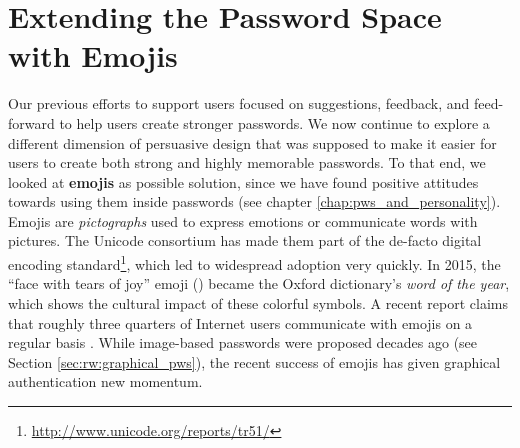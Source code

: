\chapter[Extending the Password Space with Emojis]{Extending the Password Space with Emojis}\label{chap:emojipasswords}

Our previous efforts to support users focused on suggestions, feedback, and feed-forward to help users create stronger passwords. We now continue to explore a different dimension of persuasive design that was supposed to make it easier for users to create both strong and highly memorable passwords. To that end, we looked at \textbf{emojis} as possible solution, since we have found positive attitudes towards using them inside passwords (see chapter \ref{chap:pws_and_personality}). Emojis are \textit{pictographs} used to express emotions or communicate words with pictures. The Unicode consortium has made them part of the de-facto digital encoding standard\footnote{\label{foot:emoji-standard}\url{http://www.unicode.org/reports/tr51/}}, which led to widespread adoption very quickly. In 2015, the ``face with tears of joy'' emoji () became the Oxford dictionary's \textit{word of the year}, which shows the cultural impact of these colorful symbols. A recent report claims that roughly three quarters of Internet users communicate with emojis on a regular basis \cite{EmogiResearch2016}. While image-based passwords were proposed decades ago (see Section \ref{sec:rw:graphical_pws}), the recent success of emojis has given graphical authentication new momentum. 

